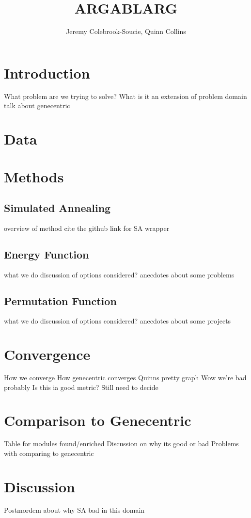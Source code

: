 \documentclass[11pt]{article}
\title{ARGABLARG}
\author{Jeremy Colebrook-Soucie, Quinn Collins}
\begin{document}
\maketitle


\section{Introduction}
What problem are we trying to solve?
What is it an extension of
problem domain
talk about genecentric
\section{Data}


\section{Methods}
\subsection{Simulated Annealing}
overview of method
cite the github link for SA wrapper

\subsection{Energy Function}
what we do
discussion of options considered?
anecdotes about some problems

\subsection{Permutation Function}
what we do
discussion of options considered?
anecdotes about some projects

\section{Convergence}
How we converge
How genecentric converges
Quinns pretty graph
Wow we're bad probably
Is this ia good metric? Still need to decide



\section{Comparison to Genecentric}
Table for modules found/enriched
Discussion on why its good or bad
Problems with comparing to genecentric


\section{Discussion}
Postmordem about why SA bad in this domain
\end{document}
